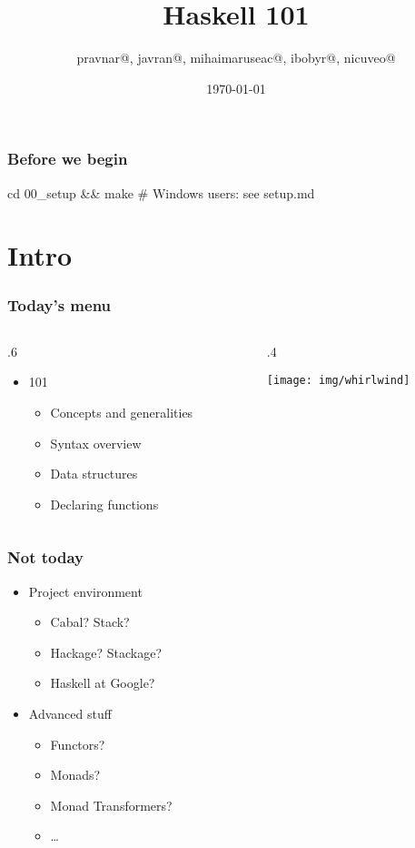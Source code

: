 \documentclass[17pt]{beamer}
\title{Haskell 101}
\author{pravnar@, javran@, mihaimaruseac@, ibobyr@, nicuveo@}
\date{\small\today}
\renewcommand{\(}[1]{\begin{columns}[#1]}
\renewcommand{\)}{\end{columns}}
\newcommand{\<}[1]{\begin{column}{#1}}
\renewcommand{\>}{\end{column}}
\begin{document}
\togglefalse{showpagenumber}
\begin{frame}[fragile]
  \frametitle{Before we begin}
  \begin{code}[setup]
cd 00_setup && make
# Windows users: see setup.md
  \end{code}
\end{frame}



\begin{frame}[fragile]
  \titlepage
\end{frame}
\toggletrue{showpagenumber}
\setcounter{framenumber}{0}


\section{Intro}

\begin{frame}
  \frametitle{Today's menu}
  \({c}
  \<{.6\textwidth}
  \begin{center}
  \begin{itemize}
  \item 101
    \begin{itemize}
    \item Concepts and generalities
    \item Syntax overview
    \item Data structures
    \item Declaring functions
    \end{itemize}
  \end{itemize}
  \end{center}
  \>
  \<{.4\textwidth}
  \begin{center}
    \texttt{[image: img/whirlwind]}
  \end{center}
  \>
  \)
\end{frame}

\begin{frame}
  \frametitle{Not today}
  \begin{center}
  \begin{itemize}
  \item Project environment
    \begin{itemize}
    \item Cabal? Stack?
    \item Hackage? Stackage?
    \item Haskell at Google?
    \end{itemize}
  \end{itemize}
  \begin{itemize}
  \item Advanced stuff
    \begin{itemize}
    \item Functors?
    \item Monads?
    \item Monad Transformers?
    \item \ldots
    \end{itemize}
  \end{itemize}
  \end{center}
\end{frame}
\end{document}
